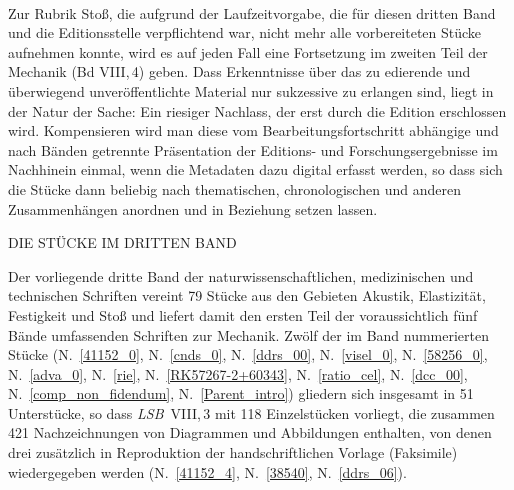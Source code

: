 \\ \indent
Zur Rubrik Stoß, die aufgrund der Laufzeitvorgabe, die für diesen dritten Band und die Editionsstelle verpflichtend war, nicht mehr alle vorbereiteten Stücke aufnehmen konnte, wird es auf jeden Fall eine Fortsetzung im zweiten Teil der Mechanik (Bd VIII,\,4) geben.
Dass Erkenntnisse über das zu edierende und überwiegend unveröffentlichte Material nur sukzessive zu erlangen sind, liegt in der Natur der Sache: Ein riesiger Nachlass, der erst durch die Edition erschlossen wird. 
Kompensieren wird man diese vom Bearbeitungsfortschritt abhängige und nach Bänden getrennte Präsentation der Editions- und Forschungsergebnisse im Nachhinein einmal, wenn die Metadaten dazu digital erfasst werden, so dass sich die Stücke dann beliebig nach thematischen, chronologischen und anderen Zusammenhängen anordnen und in Beziehung setzen lassen.
\par\noindent 
\par\vspace{6.5ex}
\noindent
\noindent\uppercase{Die Stücke im dritten Band}
\par
\vspace{1.0ex}
\noindent
%
\noindent Der vorliegende dritte Band der naturwissenschaftlichen, medizinischen und technischen Schriften vereint 79 Stücke aus den Gebieten Akustik, Elastizität, Festigkeit und Stoß und liefert damit den ersten Teil der voraussichtlich fünf Bände umfassenden Schriften zur Mechanik. Zwölf der im Band nummerierten Stücke (N.~\ref{41152_0}, N.~\ref{cnds_0}, N.~\ref{ddrs_00}, N.~\ref{visel_0}, N.~\ref{58256_0}, N.~\ref{adva_0}, N.~\ref{rie}, N.~\ref{RK57267-2+60343}, N.~\ref{ratio_cel}, N.~\ref{dcc_00}, N.~\ref{comp_non_fidendum}, N.~\ref{Parent_intro}) gliedern sich insgesamt in 51 Unterstücke, so dass \textit{LSB}~VIII,\,3 mit 118 Einzelstücken vorliegt, die zusammen 421 Nachzeichnungen von Diagrammen und Abbildungen enthalten, von denen drei zusätzlich in Reproduktion der handschriftlichen Vorlage (Faksimile) wiedergegeben werden (N.~\ref{41152_4}, N.~\ref{38540}, N.~\ref{ddrs_06}). 
